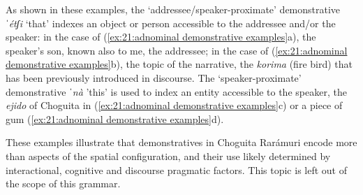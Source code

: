 As shown in these examples, the `addressee/speaker-proximate' demonstrative \textit{ˈétʃi} `that' indexes an object or person accessible to the addressee and/or the speaker: in the case of (\ref{ex:21:adnominal demonstrative examples}a), the speaker's son, known also to me, the addressee; in the case of (\ref{ex:21:adnominal demonstrative examples}b), the topic of the narrative, the \textit{korima} (fire bird) that has been previously introduced in discourse. The `speaker-proximate' demonstrative \textit{ˈnà} 'this' is used to index an entity accessible to the speaker, the \textit{ejido} of Choguita in (\ref{ex:21:adnominal demonstrative examples}c) or a piece of gum (\ref{ex:21:adnominal demonstrative examples}d).

These examples illustrate that demonstratives in Choguita Rarámuri encode more than aspects of the spatial configuration, and their use likely determined by interactional, cognitive and discourse pragmatic factors. This topic is left out of the scope of this grammar.
